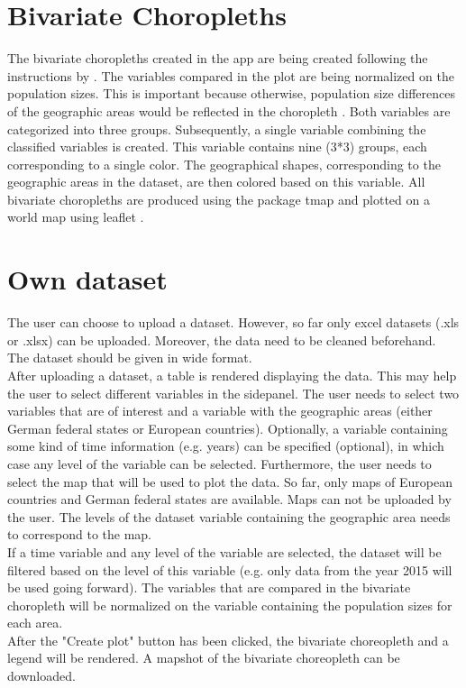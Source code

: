 \documentclass[a4paper,10pt, onecolumn]{article}\usepackage[]{graphicx}\usepackage[]{color}
\begin{document}
\section{Bivariate Choropleths}

The bivariate choropleths created in the app are being created following the instructions by . The variables compared in the plot are being normalized on the population sizes. This is important because otherwise, population size differences of the geographic areas would be reflected in the choropleth \cite{JoshuaStevens.2015}. Both variables are categorized into three groups. Subsequently, a single variable combining the classified variables is created. This variable contains nine (3*3) groups, each corresponding to a single color. The geographical shapes, corresponding to the geographic areas in the dataset, are then colored based on this variable. All bivariate choropleths are produced using the package tmap \cite{Tennekes.2018} and plotted on a world map using leaflet \cite{Cheng.2018}. 


\section{Own dataset}

The user can choose to upload a dataset. However, so far only excel datasets (.xls or .xlsx) can be uploaded. Moreover, the data need to be cleaned beforehand. The dataset should be given in wide format.\\
\hspace*{2em} After uploading a dataset, a table is rendered displaying the data. This may help the user to select different variables in the sidepanel. The user needs to select two variables that are of interest and a variable with the geographic areas (either German federal states or European countries). Optionally, a variable containing some kind of time information (e.g. years) can be specified (optional), in which case any level of the variable can be selected. Furthermore, the user needs to select the map that will be used to plot the data. So far, only maps of European countries and German federal states are available. Maps can not be uploaded by the user. The levels of the dataset variable containing the geographic area needs to correspond to the map.\\
\hspace*{2em} If a time variable and any level of the variable are selected, the dataset will be filtered based on the level of this variable (e.g. only data from the year 2015 will be used going forward). The variables that are compared in the bivariate choropleth will be normalized on the variable containing the population sizes for each area.\\
\hspace*{2em} After the "Create plot" button has been clicked, the bivariate choreopleth and a legend will be rendered. A mapshot of the bivariate choreopleth can be downloaded.
\end{document}
